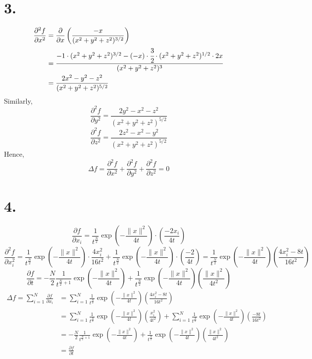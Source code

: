 \documentclass[11pt]{article}
\begin{document}
\section*{3.}
\begin{equation*}
\begin{aligned}
\frac{\partial^2 f}{\partial x^2} &= \frac{\partial}{\partial x} \left( \frac{-x}{(x^2 + y^2 + z^2)^{3/2}}\right) \\
&= \frac{-1 \cdot (x^2 + y^2 + z^2)^{3/2} - (-x) \cdot \cfrac{3}{2} \cdot  (x^2 + y^2 + z^2)^{1/2} \cdot 2x}{(x^2 + y^2 + z^2)^3} \\
&= \frac{2x^2 - y^2 - z^2}{(x^2 + y^2 + z^2)^{5/2}}
\end{aligned}
\end{equation*}
Similarly, 
\[
\frac{\partial^2 f}{\partial y^2} = \frac{2y^2 - x^2 - z^2}{(x^2 + y^2 + z^2)^{5/2}}
\]
\[
\frac{\partial^2 f}{\partial z^2} = \frac{2z^2 - x^2 - y^2}{(x^2 + y^2 + z^2)^{5/2}}
\]
Hence,
\[
\Delta f = \frac{\partial^2 f}{\partial x^2} + \frac{\partial^2 f}{\partial y^2} + \frac{\partial^2 f}{\partial z^2} = 0
\]
\pagebreak
\section*{4.}
\[
\frac{\partial f}{\partial x_i} = \frac{1}{t^{\frac{N}{2}}}\exp \left( -\frac{\|x\|^2}{4t}\right) \cdot \left(\frac{-2x_i}{4t} \right) 
\]
\[
\frac{\partial^2 f}{\partial x_i^2} = \frac{1}{t^{\frac{N}{2}}} \exp\left( -\frac{\|x\|^2}{4t}\right) \cdot \frac{4x_i^2}{16t^2} + 
\frac{1}{t^{\frac{N}{2}}}\exp \left( -\frac{\|x\|^2}{4t}\right) \cdot \left(\frac{-2}{4t} \right) = \frac{1}{t^{\frac{N}{2}}}\exp\left( -\frac{\|x\|^2}{4t}\right) \left(\frac{4x_i^2-8t}{16t^2}\right)
\]
\[
\frac{\partial f}{\partial t} = - \frac{N}{2} \frac{1}{t^{\frac{N}{2}+1}} \exp \left( -\frac{\|x\|^2}{4t}\right)  + \frac{1}{t^{\frac{N}{2}}} \exp \left( -\frac{\|x\|^2}{4t}\right) \left(\frac{\|x\|^2}{4t^2}\right) 
\]
\begin{equation*}
\begin{aligned}
\Delta f = \sum_{i=1}^N \frac{\partial f}{\partial x_i} &= \sum_{i=1}^N\frac{1}{t^{\frac{N}{2}}}\exp\left( -\frac{\|x\|^2}{4t}\right) \left(\frac{4x_i^2-8t}{16t^2}\right) \\
&= \sum_{i=1}^N\frac{1}{t^{\frac{N}{2}}}\exp\left( -\frac{\|x\|^2}{4t}\right) \left(\frac{x_i^2}{4t^2}\right) + \sum_{i=1}^N\frac{1}{t^{\frac{N}{2}}}\exp\left( -\frac{\|x\|^2}{4t}\right) \left(\frac{-8t}{16t^2}\right) \\
&= - \frac{N}{2} \frac{1}{t^{\frac{N}{2}+1}} \exp \left( -\frac{\|x\|^2}{4t}\right)  + \frac{1}{t^{\frac{N}{2}}} \exp \left( -\frac{\|x\|^2}{4t}\right) \left(\frac{\|x\|^2}{4t^2}\right) \\
&= \frac{\partial f}{\partial t}
\end{aligned}
\end{equation*}
\pagebreak
\end{document}
